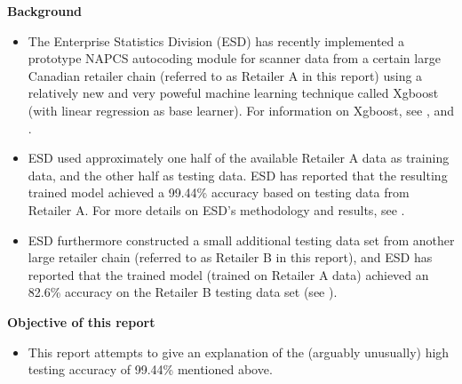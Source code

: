 
\begin{center}
\begin{minipage}{5.5in}

	\textbf{Background}
	\begin{itemize}
	\item
		The Enterprise Statistics Division (ESD) has recently implemented a prototype
		NAPCS autocoding module for scanner data from a certain large Canadian
		retailer chain (referred to as Retailer A in this report) using a relatively new
		and very poweful machine learning technique called Xgboost (with linear
		regression as base learner).
		For information on Xgboost, see \cite{Chen2016}, \cite{CRANxgboost} 
		and \cite{deVito2017}.
	\item
		ESD used approximately one half of the available Retailer A data as training
		data, and the other half as testing data.
		ESD has reported that the resulting trained model achieved a 99.44\% accuracy
		based on testing data from Retailer A.
		For more details on ESD's methodology and results, see \cite{Hatko20180302}.
	\item
		ESD furthermore constructed a small additional testing data set from another
		large retailer chain (referred to as Retailer B in this report), and ESD has
		reported that the trained model (trained on Retailer A data) achieved an 82.6\%
		accuracy on the Retailer B testing data set (see \cite{Hatko20180302}). 
	\end{itemize}

	\vskip 0.5cm
	\textbf{Objective of this report}
	\begin{itemize}
	\item
		This report attempts to give an explanation of the (arguably unusually)
		high testing accuracy of 99.44\% mentioned above.
	\end{itemize}


\end{minipage}
\end{center}
